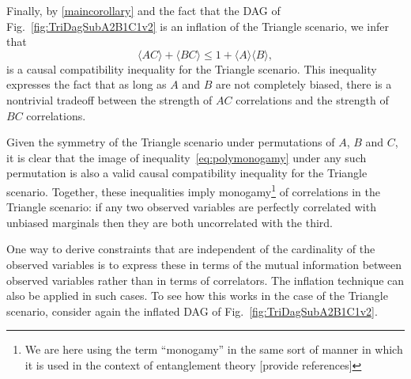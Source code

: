 Finally, by \cref{maincorollary} and the fact that the DAG of Fig.~\ref{fig:TriDagSubA2B1C1v2} is an inflation of the Triangle scenario, we infer that 
\begin{equation}
	\label{eq:polymonogamy}
	\langle A C\rangle + \langle B C\rangle \leq 1 + \langle A\rangle \langle B\rangle,
\end{equation}
is a causal compatibility inequality for the Triangle scenario.   This inequality expresses the fact that as long as $A$ and $B$ are not completely biased, there is a nontrivial tradeoff between the strength of $AC$ correlations and the strength of $BC$ correlations.   

Given the symmetry of the Triangle scenario under permutations of $A$, $B$ and $C$, it is clear that the image of inequality~\eqref{eq:polymonogamy} under any such permutation is also a valid causal compatibility inequality for the Triangle scenario.  Together, these inequalities imply monogamy\footnote{We are here using the term ``monogamy'' in the same sort of manner in which it is used in the context of entanglement theory [provide references]}  of correlations in the Triangle scenario:  if any two observed variables are perfectly correlated with unbiased marginals then they are both uncorrelated with the third.




\smallskip\nobreak

One way to derive constraints that are independent of the cardinality of the observed variables is to express these in terms of the mutual information between observed variables rather than in terms of correlators.  The inflation technique can also be applied in such cases.
To see how this works in the case of the Triangle scenario, consider again the inflated DAG of Fig.~\ref{fig:TriDagSubA2B1C1v2}.  

